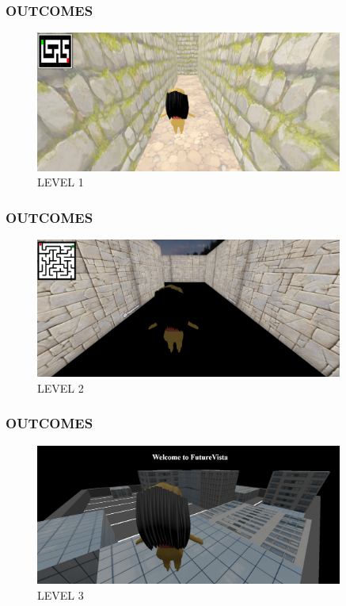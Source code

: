 \documentclass[9pt]{beamer}
\begin{document}
\begin{frame}
    \frametitle{OUTCOMES}
    \begin{figure}[h]
        \centering
        \includegraphics[width=0.9\textwidth, height=0.7\textheight]{Level1.png}
        \caption{LEVEL 1}
    \end{figure}
\end{frame}

\begin{frame}
    \frametitle{OUTCOMES}
    \begin{figure}[h]
        \centering
        \includegraphics[width=0.9\textwidth, height=0.7\textheight]{Level2.png}
        \caption{LEVEL 2}
    \end{figure}
\end{frame}

\begin{frame}
    \frametitle{OUTCOMES}
    \begin{figure}[h]
        \centering
        \includegraphics[width=0.9\textwidth, height=0.7\textheight]{Level3.png}
        \caption{LEVEL 3}
    \end{figure}
\end{frame}
\end{document}
